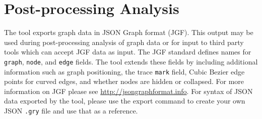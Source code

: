 \documentclass[11pt,fleqn]{article} %
\begin{document}
\section{Post-processing Analysis}
The \ggui tool exports graph data in JSON Graph format (JGF).
This output may be used during post-processing analysis of graph data or for input to third party tools which can accept JGF data as input.
The JGF standard defines names for \verb+graph+, \verb+node+, and \verb+edge+ fields. The \ggui tool extends these fields by including additional information such as graph positioning, the trace \verb+mark+ field, Cubic Bezier edge points for curved edges, and whether nodes are hidden or collapsed.
For more information on JGF please see \url{http://jsongraphformat.info}. For syntax of JSON data exported by the \ggui tool, please use the export command to create your own JSON \verb+.gry+ file and use that as a reference.
\end{document}
